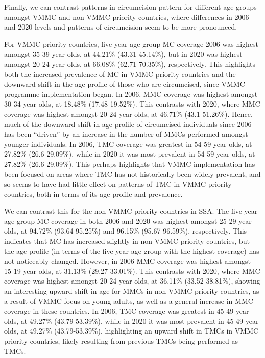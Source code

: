 \documentclass{article}
\begin{document}
Finally, we can contrast patterns in circumcision pattern for different age groups amongst VMMC and non-VMMC priority countries, where differences in 2006 and 2020 levels and patterns of circumcision seem to be more pronounced.

For VMMC priority countries, five-year age group MC coverage 2006 was highest amongst 35-39 year olds, at 44.21\% (43.31-45.14\%), but in 2020 was highest amongst 20-24 year olds, at 66.08\% (62.71-70.35\%), respectively. This highlights both the increased prevalence of MC in VMMC priority countries and the downward shift in the age profile of those who are circumcised, since VMMC programme implementation began. In 2006, MMC coverage was highest amongst 30-34 year olds, at 18.48\% (17.48-19.52\%). This contrasts with 2020, where MMC coverage was highest amongst 20-24 year olds, at 46.71\% (43.1-51.26\%). Hence, much of the downward shift in age profile of circumcised individuals since 2006 has been ``driven'' by an increase in the number of MMCs performed amongst younger individuals. In 2006, TMC coverage was greatest in 54-59 year olds, at 27.82\% (26.6-29.09\%). while in 2020 it was most prevalent in 54-59 year olds, at 27.82\% (26.6-29.09\%). This perhaps highlights that VMMC implementation has been focused on areas where TMC has not historically been widely prevalent, and so seems to have had little effect on patterns of TMC in VMMC priority countries, both in terms of its age profile and prevalence.

We can contrast this for the non-VMMC priority countries in SSA. The five-year age group MC coverage in both 2006 and 2020 was highest amongst 25-29 year olds, at 94.72\% (93.64-95.25\%) and 96.15\% (95.67-96.59\%), respectively. This indicates that MC has increased slightly in non-VMMC priority countries, but the age profile (in terms of the five-year age group with the highest coverage) has not noticeably changed. However, in 2006 MMC coverage was highest amongst 15-19 year olds, at 31.13\% (29.27-33.01\%). This contrasts with 2020, where MMC coverage was highest amongst 20-24 year olds, at 36.11\% (33.52-38.81\%), showing an interesting upward shift in age for MMCs in non-VMMC priority countries, as a result of VMMC focus on young adults, as well as a general increase in MMC coverage in these countries. In 2006, TMC coverage was greatest in 45-49 year olds, at 49.27\% (43.79-53.39\%), while in 2020 it was most prevalent in 45-49 year olds, at 49.27\% (43.79-53.39\%), highlighting an upward shift in TMCs in VMMC priority countries, likely resulting from previous TMCs being performed as TMCs.
\end{document}
